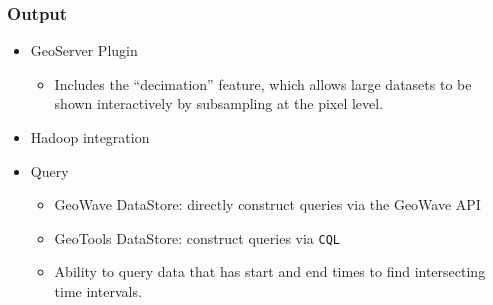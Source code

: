 \subsubsection*{Output}

\begin{itemize}
\item{
  GeoServer Plugin
  \begin{itemize}
  \item Includes the ``decimation'' feature, which allows large datasets to be shown interactively by subsampling at the pixel level.
  \end{itemize}
}
\item Hadoop integration
\item{
  Query
  \begin{itemize}
    \item GeoWave DataStore: directly construct queries via the GeoWave API
    \item GeoTools DataStore: construct queries via \texttt{CQL}
    \item Ability to query data that has start and end times to find intersecting time intervals.
  \end{itemize}
}
\end{itemize}

